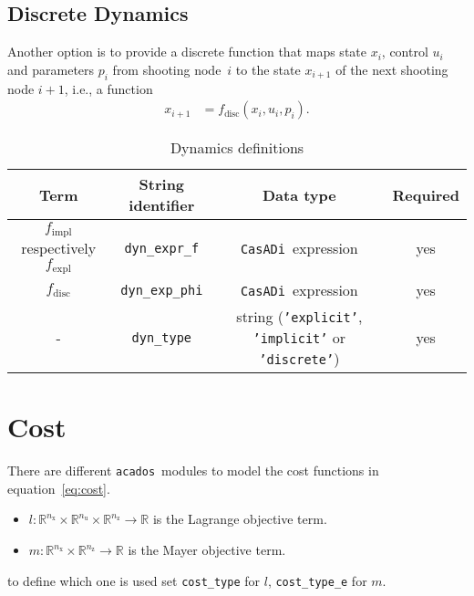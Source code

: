 \documentclass[english]{article}
\newcommand{\code}[1]{\texttt{#1}}
\newcommand{\str}[1]{\texttt{'#1'}}
\newcommand{\casadi}{\texttt{CasADi}}
\newcommand{\acados}{\texttt{acados}}
\newcommand{\ind}[1]{_{\textrm{#1}}}
\newcommand{\nx}{n\ind{x}}
\newcommand{\nuu}{n\ind{u}}
\newcommand{\nz}{n\ind{z}}
\newcommand{\mandatory}{yes}
\begin{document}
\subsection{Discrete Dynamics}\label{sec:dynamics:discrete}
%
Another option is to provide a discrete function that maps state $x_i$, control $u_i$ and parameters $p_i$ from shooting node~$i$ to the state $x_{i+1}$ of the next shooting node $i+1$, i.e., a function
\begin{align}
x_{i+1} &= f\ind{disc}(x_i,u_i,p_i).\label{eq:dynamics:discrete}
\end{align}
%
\begin{table}[h!]
    \centering
    \caption{Dynamics definitions} \label{tab:dynamics}
    \begin{tabular}{cccc}
        \toprule
        Term & String identifier & Data type & Required \\ \midrule
        $ f\ind{impl} $ respectively $ f\ind{expl} $ & \code{dyn\_expr\_f}    & \casadi~expression & \mandatory \\
        $f\ind{disc}$ & \code{dyn\_exp\_phi} & \casadi~expression & \mandatory \\
        - & \code{dyn\_type}    & string (\str{explicit}, \str{implicit} or \str{discrete}) & \mandatory \\
        \bottomrule
    \end{tabular}
\end{table}
%
\section{Cost}\label{sec:cost}
%
There are different \acados~modules to model the cost functions in equation~\eqref{eq:cost}.
\begin{itemize}
\item $ l: \mathbb{R}^{\nx}\times\mathbb{R}^{\nuu}\times\mathbb{R}^{\nz} \rightarrow \mathbb{R}$ is the Lagrange objective term.
\item $ m: \mathbb{R}^{\nx}\times\mathbb{R}^{\nz} \rightarrow \mathbb{R} $ is the Mayer objective term.
\end{itemize}
to define which one is used set \code{cost\_type} for $l$, \code{cost\_type\_e} for $m$.
\end{document}
